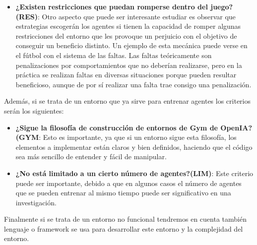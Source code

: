 \begin{itemize}
    \item \textbf{¿Existen restricciones que puedan romperse dentro del juego?(RES)}: Otro aspecto que puede ser interesante estudiar es observar que estrategias escogerán los agentes si tienen la capacidad de romper algunas restricciones del entorno que les provoque un perjuicio con el objetivo de conseguir un beneficio distinto. Un ejemplo de esta mecánica puede verse en el fútbol con el sistema de las faltas. Las faltas teóricamente son penalizaciones por comportamientos que no deberían realizarse, pero en la práctica se realizan faltas en diversas situaciones porque pueden resultar beneficioso, aunque de por sí realizar una falta trae consigo una penalización.
\end{itemize}

Además, si se trata de un entorno que ya sirve para entrenar agentes los criterios serán los siguientes:
\begin{itemize}
    \item \textbf{¿Sigue la filosofía de construcción de entornos de Gym de OpenIA?(GYM}: Esto es importante, ya que si un entorno sigue esta filosofía, los elementos a implementar están claros y bien definidos, haciendo que el código sea más sencillo de entender y fácil de manipular. 
    \item \textbf{¿No está limitado a un cierto número de agentes?(LIM)}: Este criterio puede ser importante, debido a que en algunos casos el número de agentes que se pueden entrenar al mismo tiempo puede ser significativo en una investigación.
\end{itemize}

Finalmente si se trata de un entorno no funcional tendremos en cuenta también lenguaje o framework se usa para desarrollar este entorno y la complejidad del entorno.



